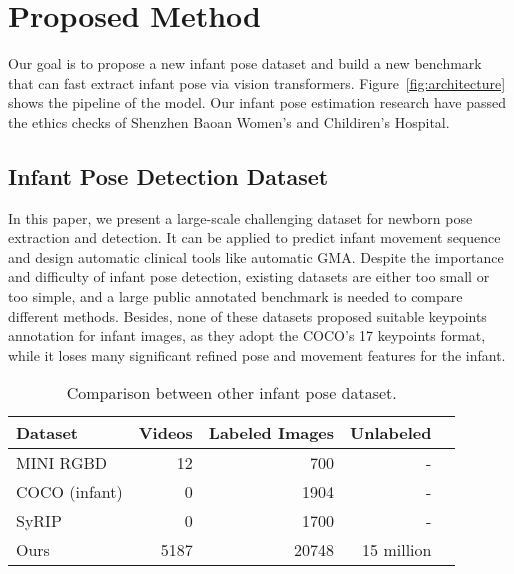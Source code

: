 \documentclass{article}
\begin{document}
\section{Proposed Method}

Our goal is to propose a new infant pose dataset and build a new benchmark that can fast extract infant pose via vision transformers. Figure~\ref{fig:architecture} shows the pipeline of the model. Our infant pose estimation research have passed the ethics checks of Shenzhen Baoan Women's and Childiren's Hospital.

\subsection{Infant Pose Detection Dataset}

In this paper, we present a large-scale challenging dataset for newborn pose extraction and detection. It can be applied to predict infant movement sequence and design automatic clinical tools like automatic GMA. Despite the importance and difficulty of infant pose detection, existing datasets are either too small or too simple, and a large public annotated benchmark is needed to compare different methods. Besides, none of these datasets proposed suitable keypoints annotation for infant images, as they adopt the COCO's 17 keypoints format, while it loses many significant refined pose and movement features for the infant.


\begin{table}
\centering
\begin{tabular}{lrrrr}
\toprule
Dataset  & Videos & Labeled Images & Unlabeled \\
\midrule
MINI RGBD    & 12   & 700  & -       \\
COCO (infant)    &  0  & 1904  &  -      \\
SyRIP    & 0  & 1700  & -    \\
Ours    & 5187  & 20748  & 15 million    \\
\bottomrule
\end{tabular}
\caption{Comparison between other infant pose dataset.}
\label{tab:dataset}
\end{table}
\end{document}

